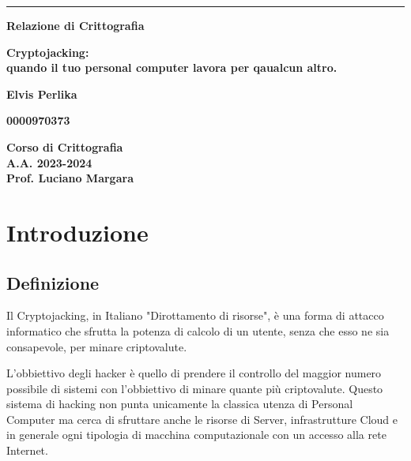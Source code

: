 \documentclass[12pt,a4paper]{article}
\begin{document}
\begin{titlepage}
\begin{center}
\rule[0.5cm]{15.8cm}{0.6mm}
{\small{\bf Relazione di Crittografia }}
\end{center}
\vspace{15mm}
\begin{center}
{\LARGE{\bf Cryptojacking:} \\ 
\vspace{3mm}
{\bf quando il tuo personal computer lavora per qaualcun altro.}}
\end{center}
\vspace{35mm}
\par
\noindent
\begin{center}
{\large{\bf Elvis Perlika}}
\end{center}
\begin{center}
{\large{\bf 0000970373}}
\end{center}
\hfill

\vspace{70mm}
\begin{center}
{\large{\bf Corso di Crittografia \\ 
A.A. 2023-2024 \\
Prof. Luciano Margara}}
\end{center}
\end{titlepage}

\newpage

\tableofcontents

\newpage

\section{Introduzione}
\subsection{Definizione}

Il Cryptojacking, in Italiano "Dirottamento di risorse", è una forma di attacco
informatico che sfrutta la potenza di calcolo di un utente, senza che esso ne
sia consapevole, per minare criptovalute. \cite{CSO}

L'obbiettivo degli hacker è quello di prendere il controllo del maggior
numero possibile di sistemi con l'obbiettivo di minare quante più criptovalute. Questo sistema di hacking non punta unicamente la classica utenza
di Personal Computer ma cerca di sfruttare anche le risorse di Server,
infrastrutture Cloud e in generale ogni tipologia di macchina computazionale con un accesso alla rete Internet.
\end{document}
